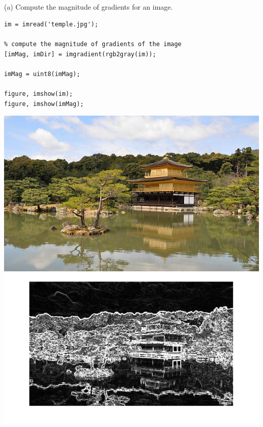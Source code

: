 \documentclass[11pt]{article}
\begin{document}
\section{}
(a) Compute the magnitude of gradients for an image.
\begin{lstlisting}
im = imread('temple.jpg');

% compute the magnitude of gradients of the image
[imMag, imDir] = imgradient(rgb2gray(im));

imMag = uint8(imMag);

figure, imshow(im);
figure, imshow(imMag);
\end{lstlisting}
\includegraphics[scale=0.5]{temple}
\\
\includegraphics[scale=0.5]{templeGrad}
\end{document}
